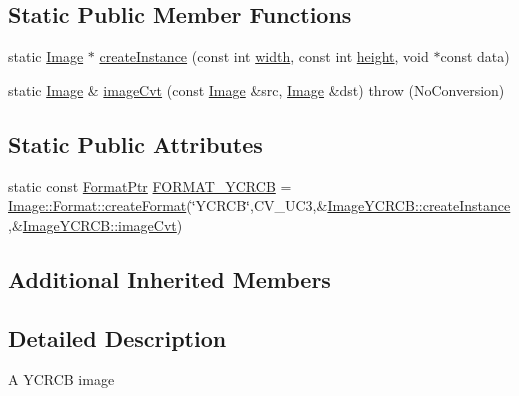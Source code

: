\subsection*{Static Public Member Functions}
\begin{DoxyCompactItemize}
\item 
static \hyperlink{classcolorspaces_1_1_image}{Image} $\ast$ \hyperlink{classcolorspaces_1_1_image_y_c_r_c_b_ad2774884c1acea49b7c6799839763a02}{create\+Instance} (const int \hyperlink{classcolorspaces_1_1_image_ab80af7d4797110c23ed575b329ec7c4f}{width}, const int \hyperlink{classcolorspaces_1_1_image_a99a05ebd37f61215b2c3042ecaefdbfc}{height}, void $\ast$const data)
\item 
static \hyperlink{classcolorspaces_1_1_image}{Image} \& \hyperlink{classcolorspaces_1_1_image_y_c_r_c_b_aae06774e3c6de95fdd0fc20d87eb1400}{image\+Cvt} (const \hyperlink{classcolorspaces_1_1_image}{Image} \&src, \hyperlink{classcolorspaces_1_1_image}{Image} \&dst)  throw (\+No\+Conversion)
\end{DoxyCompactItemize}
\subsection*{Static Public Attributes}
\begin{DoxyCompactItemize}
\item 
static const \hyperlink{classcolorspaces_1_1_image_ab3978cc7acc2b5e855f8c715f09667d1}{Format\+Ptr} \hyperlink{classcolorspaces_1_1_image_y_c_r_c_b_a9423fb6d470113987bd078e88ff46cb8}{F\+O\+R\+M\+A\+T\+\_\+\+Y\+C\+R\+CB} = \hyperlink{classcolorspaces_1_1_image_1_1_format_ae79208f237b72cf596331ebcec2ff58b}{Image\+::\+Format\+::create\+Format}(\char`\"{}Y\+C\+R\+CB\char`\"{},C\+V\+\_\+U\+C3,\&\hyperlink{classcolorspaces_1_1_image_y_c_r_c_b_ad2774884c1acea49b7c6799839763a02}{Image\+Y\+C\+R\+C\+B\+::create\+Instance},\&\hyperlink{classcolorspaces_1_1_image_y_c_r_c_b_aae06774e3c6de95fdd0fc20d87eb1400}{Image\+Y\+C\+R\+C\+B\+::image\+Cvt})
\end{DoxyCompactItemize}
\subsection*{Additional Inherited Members}


\subsection{Detailed Description}
A Y\+C\+R\+CB image 

